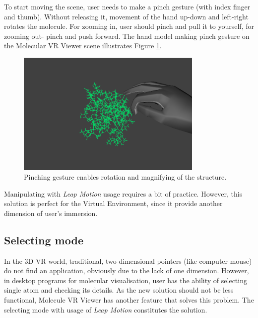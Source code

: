 To start moving the scene, user needs to make a pinch gesture (with index finger and thumb). Without releasing it, movement of the hand up-down and left-right rotates the molecule. For zooming in, user should pinch and pull it to yourself, for zooming out- pinch and push forward. The hand model making pinch gesture on the Molecular VR Viewer scene illustrates Figure \ref{fig:pinch}.    

\begin{figure}[!htb]
\centering    
\includegraphics[width=0.8\textwidth]{Figs/pinch.png}
\caption{Pinching gesture enables rotation and magnifying of the structure.}
\label{fig:pinch} 
\end{figure}

Manipulating with \textit{Leap Motion} usage requires a bit of practice. However, this solution is perfect for the Virtual Environment, since it provide another dimension of user's immersion.

\subsection{Selecting mode}

In the 3D VR world, traditional, two-dimensional pointers (like computer mouse) do not find an application, obviously due to the lack of one dimension. However, in desktop programs for molecular visualisation, user has the ability of selecting single atom and checking its details. As the new solution should not be less functional, Molecule VR Viewer has another feature that solves this problem. The selecting mode with usage of \textit{Leap Motion} constitutes the solution.

